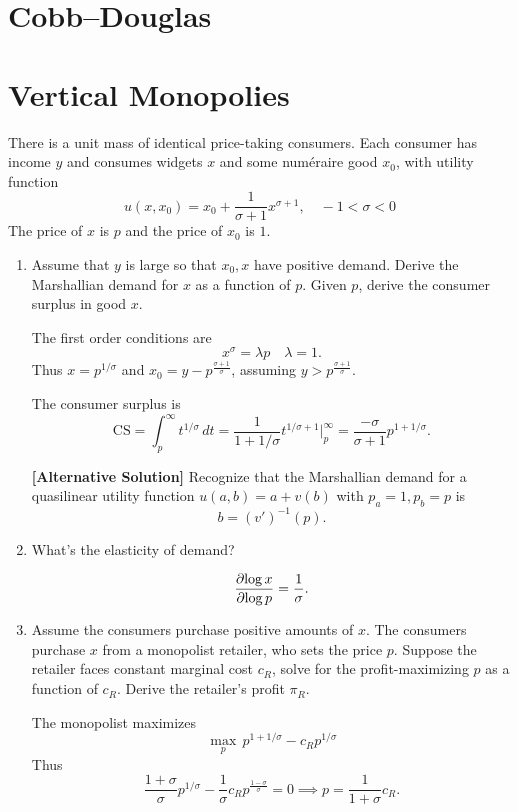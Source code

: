 \documentclass[11pt]{article}
\begin{document}
\section{Cobb--Douglas}

\section{Vertical Monopolies}
There is a unit mass of identical price-taking consumers. Each consumer has income $y$ and consumes widgets $x$ and some num\'eraire good $x_0$, with utility function \[
u(x, x_0) = x_0 + \frac{1}{\sigma+1} x^{\sigma+1}, \quad -1 < \sigma < 0
\]
The price of $x$ is $p$ and the price of $x_0$ is $1$.
\begin{enumerate}
    \item Assume that $y$ is large so that $x_0, x$ have positive demand. Derive the Marshallian demand for $x$ as a function of $p$. Given $p$, derive the consumer surplus in good $x$.
    \begin{sol}
        The first order conditions are \[
        x^{\sigma} = \lambda p \quad \lambda = 1.
        \]
        Thus $x = p^{1/\sigma}$ and $x_0 = y - p^{\frac{\sigma + 1}{\sigma}}$, assuming $y > p^{\frac{\sigma + 1}{\sigma}}$. 
        
        The consumer surplus is \[
        \text{CS} = \int_{p}^{\infty} t^{1/\sigma}\,dt = \frac{1}{1+1/\sigma}t^{1/\sigma + 1}\Bigg \rvert_{p}^\infty = \frac{-\sigma}{\sigma + 1} p^{1 + 1/\sigma}.
        \]
    \end{sol}
    
     \begin{sol}\textbf{[Alternative Solution]}
          Recognize that the Marshallian demand for a quasilinear utility function $u(a,b) = a + v(b)$ with $p_a=1, p_b=p$ is \[b = (v')^{-1}(p).\]
              \end{sol} 
    \item What's the elasticity of demand?
    \begin{sol}
        \[
        \frac{\partial{\log x}}{\partial{ \log p}} = \frac{1}{\sigma}. 
        \]
    \end{sol}
    \item 
    Assume the consumers purchase positive amounts of $x$.
    The consumers purchase $x$ from a monopolist retailer, who sets the price $p$. Suppose the retailer faces constant marginal cost $c_R$, solve for the profit-maximizing $p$ as a function of $c_R$. Derive the retailer's profit $\pi_R$. 
    \begin{sol}
         The monopolist maximizes \[
         \max_p \, p^{1+1/\sigma} - c_R p^{1/\sigma} 
         \]
         Thus \[
         \frac{1+\sigma}{\sigma} p^{1/\sigma} - \frac{1}{\sigma}c_R p^{\frac{1-\sigma}{\sigma}} = 0 \implies p = \frac{1}{1+\sigma} c_R. 
         \]
         

\end{sol}
\end{enumerate}
\end{document}
